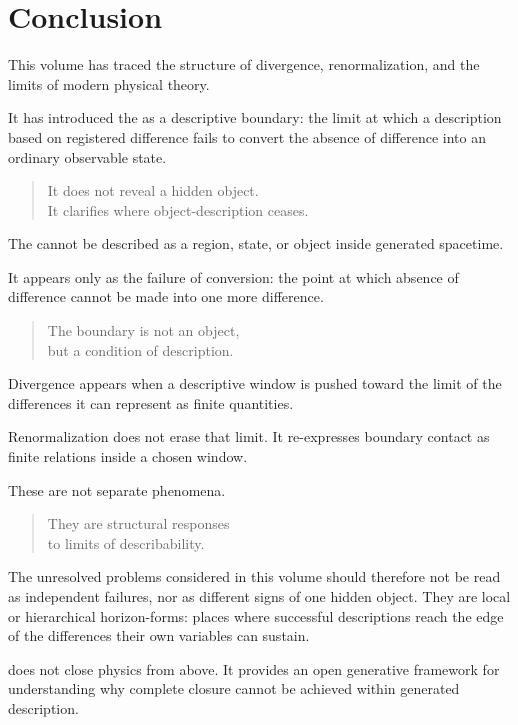 \section{Conclusion}

\label{sec:conclusion}

This volume has traced the structure
of divergence, renormalization,
and the limits of modern physical theory.

It has introduced the \DH{}
as a descriptive boundary:
the limit at which a description based on registered difference
fails to convert the absence of difference
into an ordinary observable state.

\medskip
\begin{quote}
It does not reveal a hidden object.\\
It clarifies where object-description ceases.
\end{quote}
\medskip

The \ungenerated{} cannot be described
as a region,
state,
or object inside generated spacetime.

It appears only as the failure of conversion:
the point at which absence of difference
cannot be made into one more difference.

\medskip
\begin{quote}
The boundary is not an object,\\
but a condition of description.
\end{quote}
\medskip

Divergence appears
when a descriptive window is pushed toward the limit
of the differences it can represent as finite quantities.

Renormalization does not erase that limit.
It re-expresses boundary contact
as finite relations inside a chosen window.

These are not separate phenomena.

\medskip
\begin{quote}
They are structural responses\\
to limits of describability.
\end{quote}
\medskip

The unresolved problems considered in this volume
should therefore not be read as independent failures,
nor as different signs of one hidden object.
They are local or hierarchical horizon-forms:
places where successful descriptions reach the edge
of the differences their own variables can sustain.

\VED{} does not close physics from above.
It provides an open generative framework
for understanding why complete closure cannot be achieved
within generated description.


